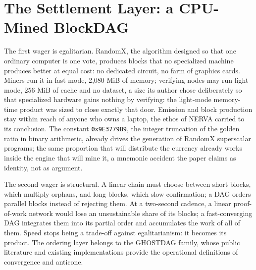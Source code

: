 \section{The Settlement Layer: a CPU-Mined BlockDAG}\label{sec:settlement}

The first wager is egalitarian. RandomX, the algorithm designed so that one
ordinary computer is one vote, produces blocks that no specialized machine
produces better at equal cost: no dedicated circuit, no farm of graphics
cards. Miners run it in fast mode, 2,080 MiB of memory; verifying nodes may
run light mode, 256 MiB of cache and no dataset, a size its author chose
deliberately so that specialized hardware gains nothing by verifying: the
light-mode memory-time product was sized to close exactly that door.
Emission and block production stay within reach of anyone who owns
a laptop, the ethos of NERVA carried to its conclusion. The constant
\texttt{0x9E3779B9}, the integer truncation of the golden ratio in binary
arithmetic, already drives the generation of RandomX superscalar programs;
the same proportion that will distribute the currency already works inside
the engine that will mine it, a mnemonic accident the paper claims as
identity, not as argument.

The second wager is structural. A linear chain must choose between short
blocks, which multiply orphans, and long blocks, which slow confirmation;
a DAG orders parallel blocks instead of rejecting them. At a two-second
cadence, a linear proof-of-work network would lose an unsustainable share
of its blocks; a fast-converging DAG integrates them into its partial
order and accumulates the work of all of them. Speed stops being a
trade-off against egalitarianism: it becomes its product. The ordering
layer belongs to the GHOSTDAG family, whose public literature and existing
implementations provide the operational definitions of convergence and
anticone.

